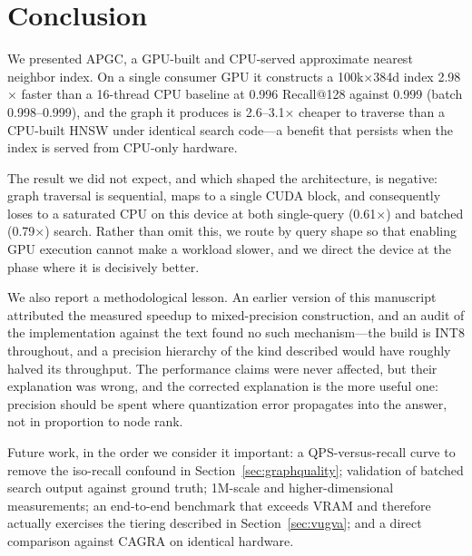 \documentclass[11pt,twocolumn]{article}
\begin{document}
\section{Conclusion}
\label{sec:conclusion}

We presented APGC, a GPU-built and CPU-served approximate nearest neighbor
index. On a single consumer GPU it constructs a 100k$\times$384d index
2.98$\times$ faster than a 16-thread CPU baseline at 0.996 Recall@128 against
0.999 (batch 0.998--0.999), and the graph it produces is 2.6--3.1$\times$ cheaper to traverse than a
CPU-built HNSW under identical search code---a benefit that persists when the
index is served from CPU-only hardware.

The result we did not expect, and which shaped the architecture, is negative:
graph traversal is sequential, maps to a single CUDA block, and consequently
loses to a saturated CPU on this device at both single-query (0.61$\times$) and
batched (0.79$\times$) search. Rather than omit this, we route by query shape so
that enabling GPU execution cannot make a workload slower, and we direct the
device at the phase where it is decisively better.

We also report a methodological lesson. An earlier version of this manuscript
attributed the measured speedup to mixed-precision construction, and an audit of
the implementation against the text found no such mechanism---the build is INT8
throughout, and a precision hierarchy of the kind described would have roughly
halved its throughput. The performance claims were never affected, but their
explanation was wrong, and the corrected explanation is the more useful one:
precision should be spent where quantization error propagates into the answer,
not in proportion to node rank.

Future work, in the order we consider it important: a QPS-versus-recall curve to
remove the iso-recall confound in Section~\ref{sec:graphquality}; validation of
batched search output against ground truth; 1M-scale and higher-dimensional
measurements; an end-to-end benchmark that exceeds VRAM and therefore actually
exercises the tiering described in Section~\ref{sec:vugva}; and a direct
comparison against CAGRA on identical hardware.
\end{document}

